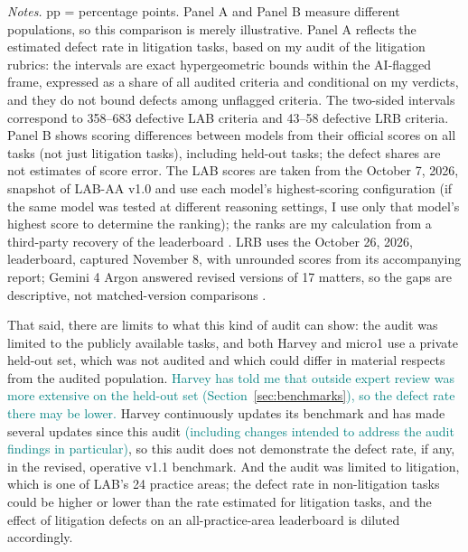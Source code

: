 \documentclass[11pt]{article}
\newcommand{\pending}[1]{\textcolor{teal}{#1}}
\begin{document}
\begin{table}[htbp]
\smallskip
\begin{minipage}{\linewidth}\footnotesize
\textit{Notes.} pp = percentage points. Panel A and Panel B measure different populations, so this comparison is merely illustrative. Panel A reflects the estimated defect rate in litigation tasks, based on my audit of the litigation rubrics: the intervals are exact hypergeometric bounds within the AI-flagged frame, expressed as a share of all audited criteria and conditional on my verdicts, and they do not bound defects among unflagged criteria. The two-sided intervals correspond to 358--683 defective LAB criteria and 43--58 defective LRB criteria. Panel B shows scoring differences between models from their official scores on all tasks (not just litigation tasks), including held-out tasks; the defect shares are not estimates of score error. The LAB scores are taken from the October 7, 2026, snapshot of LAB-AA v1.0 and use each model's highest-scoring configuration (if the same model was tested at different reasoning settings, I use only that model's highest score to determine the ranking); the ranks are my calculation from a third-party recovery of the leaderboard \citep{labAAv1snapshot}. LRB uses the October 26, 2026, leaderboard, captured November 8, with unrounded scores from its accompanying report; Gemini 4 Argon answered revised versions of 17 matters, so the gaps are descriptive, not matched-version comparisons \citep{micro1LRB,lrbLeaderboardSnapshot}.
\end{minipage}
\end{table}

That said, there are limits to what this kind of audit can show: the audit was limited to the publicly available tasks, and both Harvey and micro1 use a private held-out set, which was not audited and which could differ in material respects from the audited population. \pending{Harvey has told me that outside expert review was more extensive on the held-out set (Section~\ref{sec:benchmarks}), so the defect rate there may be lower.} Harvey continuously updates its benchmark and has made several updates since this audit \pending{(including changes intended to address the audit findings in particular)}, so this audit does not demonstrate the defect rate, if any, in the revised, operative v1.1 benchmark. And the audit was limited to litigation, which is one of LAB's 24 practice areas; the defect rate in non-litigation tasks could be higher or lower than the rate estimated for litigation tasks, and the effect of litigation defects on an all-practice-area leaderboard is diluted accordingly.
\end{document}
